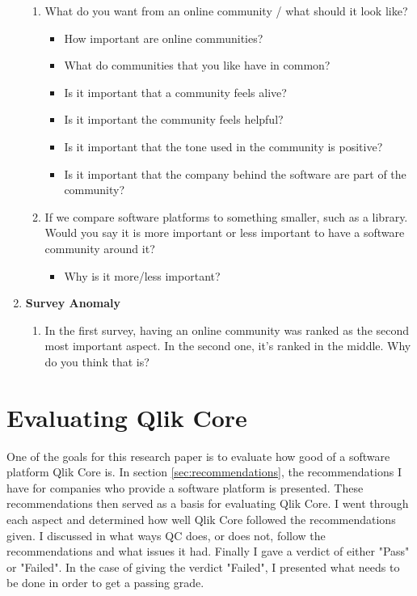 \documentclass{cslthse-msc}
\begin{document}
\begin{enumerate}[label=C\Alph*]
        \begin{enumerate}[label=CC\arabic*]
            \item	What do you want from an online community / what should it look like?
            \begin{itemize}[label={-}]
                \item How important are online communities?
                \item What do communities that you like have in common?
                \item Is it important that a community feels alive?
                \item Is it important the community feels helpful?
                \item Is it important that the tone used in the community is positive?
                \item Is it important that the company behind the software are part of the community?
            \end{itemize}
            \item	If we compare software platforms to something smaller, such as a library. Would you say it is more important or less important to have a software community around it?
            \begin{itemize}[label={-}]
                \item Why is it more/less important?
            \end{itemize}
        \end{enumerate}
        \item \textbf{Survey Anomaly}
        \begin{enumerate}[label={CD\arabic*}]
            \item In the first survey, having an online community was ranked as the second most important aspect. In the second one, it’s ranked in the middle. Why do you think that is?
        \end{enumerate}
    \end{enumerate}

    \section{Evaluating Qlik Core}
    One of the goals for this research paper is to evaluate how good of a software platform Qlik Core is. In section \ref{sec:recommendations}, the recommendations I have for companies who provide a software platform is presented. These recommendations then served as a basis for evaluating Qlik Core. I went through each aspect and determined how well Qlik Core followed the recommendations given. I discussed in what ways QC does, or does not, follow the recommendations and what issues it had. Finally I gave a verdict of either "Pass" or "Failed". In the case of giving the verdict "Failed", I presented what needs to be done in order to get a passing grade.
\end{document}
